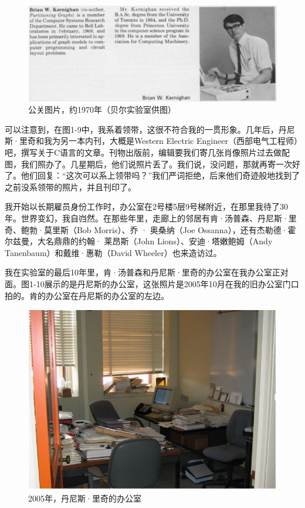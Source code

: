 \documentclass[a4paper,12pt,UTF8,twoside]{ctexbook}
\begin{document}
\begin{figure}[htbp]
	\centering
	\includegraphics[width=0.7\linewidth]{9}
	\caption{公关图片，约1970年（贝尔实验室供图）}
	\label{fig:1}
\end{figure}

可以注意到，在图1-9中，我系着领带，这很不符合我的一贯形象。几年后，丹尼斯·里奇和我为另一本内刊，大概是Western Electric Engineer（西部电气工程师）吧，撰写关于C语言的文章。刊物出版前，编辑要我们寄几张肖像照片过去做配图，我们照办了。几星期后，他们说照片丢了。我们说，没问题，那就再寄一次好了。他们回复：“这次可以系上领带吗？”我们严词拒绝，后来他们奇迹般地找到了之前没系领带的照片，并且刊印了。

我开始以长期雇员身份工作时，办公室在2号楼5层9号梯附近，在那里我待了30年。世界变幻，我自岿然。在那些年里，走廊上的邻居有肯·汤普森、丹尼斯·里奇、鲍勃·莫里斯（Bob Morris）、乔 · 奥桑纳（Joe Ossanna），还有杰勒德·霍尔兹曼，大名鼎鼎的约翰· 莱昂斯（John Lions）、安迪·塔嫩鲍姆（Andy Tanenbaum）和戴维·惠勒（David Wheeler）也来造访过。

我在实验室的最后10年里，肯·汤普森和丹尼斯·里奇的办公室在我办公室正对面。图1-10展示的是丹尼斯的办公室，这张照片是2005年10月在我的旧办公室门口拍的。肯的办公室在丹尼斯的办公室的左边。

\begin{figure}[htbp]
	\centering
	\includegraphics[width=0.7\linewidth]{10}
	\caption{2005年，丹尼斯·里奇的办公室}
	\label{fig:1}
\end{figure}
\end{document}
